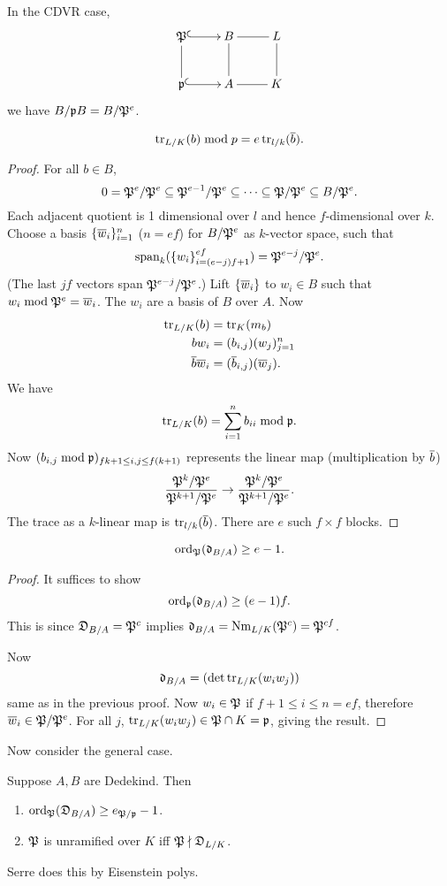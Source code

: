In the CDVR case,
\[
\xymatrix{
\mP \ar@{^(->}[r] \ar@{-}[d] & B \ar@{-}[r]\ar@{-}[d] &L \ar@{-}[d]\\
\mfp\ar@{^(->}[r]& A\ar@{-}[r] &K
}
\]
we have $B/\mathfrak{p} B=B/\mathfrak{P}^e$. 
\begin{lem}
\[
\operatorname{tr}_{L/K}(b)\bmod p = e\operatorname{tr}_{l/k} (\overline{b}).
\]
\end{lem}
\begin{proof}
For all $b\in B$, 
\[
0=\mathfrak{P}^e/\mathfrak{P}^e\subseteq \mathfrak{P}^{e-1}/\mathfrak{P}^e\subseteq \cdots \subseteq \mathfrak{P}/\mathfrak{P}^e \subseteq B/\mathfrak{P}^e.
\]
Each adjacent quotient is 1 dimensional over $l$ and hence $f$-dimensional over $k$.
Choose a basis $\{\overline{w}_i\}_{i=1}^n$ ($n=ef$) for $B/\mathfrak{P}^e$ as $k$-vector space, such that
\[
\operatorname{span}_k(\{w_i\}_{i=(e-j)f+1}^{ef})=\mathfrak{P}^{e-j}/\mathfrak{P}^e.
\]
(The last $jf$ vectors span $\mathfrak{P}^{e-j}/\mathfrak{P}^e$.) Lift $\{\overline{w}_i\}$ to $w_i\in B$ such that $w_i\bmod{\mathfrak{P}^e}=\overline{w}_i$. The $w_i$ are a basis of $B$ over $A$. Now
\begin{align*}
\operatorname{tr}_{L/K}(b)&=\operatorname{tr}_K (m_b)\\
b w_i&=(b_{i,j}) (w_j)_{j=1}^n\\
\overline{b}\overline{w}_i &= (\overline{b}_{i,j})(\overline{w}_j).
\end{align*}
We have
\[
\operatorname{tr}_{L/K}(b)=\sum_{i=1}^n b_{ii} \bmod{\mathfrak{p}}.
\]
Now $(b_{i,j}\bmod{\mathfrak{p}})_{fk+1\le i,j\le f(k+1)}$ represents the linear map (multiplication by $\overline{b}$)
\[
\frac{\mathfrak{P}^k/\mathfrak{P}^e}{\mathfrak{P}^{k+1}/\mathfrak{P}^{e}}\to \frac{\mathfrak{P}^k/\mathfrak{P}^e}{\mathfrak{P}^{k+1}/\mathfrak{P}^e}.
\]
The trace as a $k$-linear map is $\operatorname{tr}_{l/k}(\overline{b})$. There are $e$ such $f\times f$ blocks.
\end{proof}
\begin{cor}
\[
\operatorname{ord}_{\mathfrak{P}}(\mathfrak {\mathfrak d}_{B/A})\ge e-1.
\]
\end{cor}
\begin{proof}
It suffices to show
\[
\operatorname{ord}_{\mathfrak{p}}(\mathfrak {\mathfrak d}_{B/A})\ge (e-1)f.
\]
This is since $\mathfrak D_{B/A}=\mathfrak{P}^c$ implies $\mathfrak d_{B/A} = \operatorname{Nm}_{L/K}(\mathfrak{P}^c)=\mathfrak{P}^{cf}$.

Now
\[
\mathfrak d_{B/A}=(\det \operatorname{tr}_{L/K}(w_iw_j))
\]
same as in the previous proof. Now $w_i\in \mathfrak{P}$ if $f+1\le i\le n=ef$, therefore $\overline{w}_i\in \mathfrak{P}/\mathfrak{P}^e$.
For all $j$, $\operatorname{tr}_{L/K}(w_iw_j)\in \mathfrak{P}\cap K=\mathfrak{p}$, giving the result.
\end{proof}
Now consider the general case.
\begin{thm}
Suppose $A,B$ are Dedekind. Then
\begin{enumerate}
\item
$\operatorname{ord}_{\mathfrak{P}}(\mathfrak D_{B/A})\ge e_{\mathfrak{P}/\mathfrak{p}}-1$.
\item
$\mathfrak{P}$ is unramified over $K$ iff $\mathfrak{P}\nmid \mathfrak D_{L/K}$.
\end{enumerate}
Serre does this by Eisenstein polys.
\end{thm}
